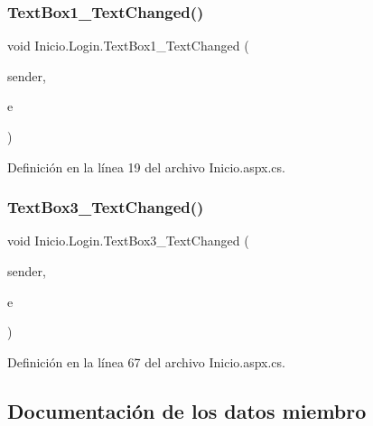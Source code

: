 \subsubsection{\texorpdfstring{TextBox1\_TextChanged()}{TextBox1\_TextChanged()}}
{\footnotesize\ttfamily void Inicio.\+Login.\+Text\+Box1\+\_\+\+Text\+Changed (\begin{DoxyParamCaption}\item[{object}]{sender,  }\item[{Event\+Args}]{e }\end{DoxyParamCaption})\hspace{0.3cm}{\ttfamily [protected]}}



Definición en la línea 19 del archivo Inicio.\+aspx.\+cs.


\begin{DoxyCode}{0}

\end{DoxyCode}
\mbox{\label{classInicio_1_1Login_a332bc2333d4b1baf24c09b02f343734b}} 
\subsubsection{\texorpdfstring{TextBox3\_TextChanged()}{TextBox3\_TextChanged()}}
{\footnotesize\ttfamily void Inicio.\+Login.\+Text\+Box3\+\_\+\+Text\+Changed (\begin{DoxyParamCaption}\item[{object}]{sender,  }\item[{Event\+Args}]{e }\end{DoxyParamCaption})\hspace{0.3cm}{\ttfamily [protected]}}



Definición en la línea 67 del archivo Inicio.\+aspx.\+cs.


\begin{DoxyCode}{0}

\end{DoxyCode}


\subsection{Documentación de los datos miembro}
\mbox{\label{classInicio_1_1Login_a538759688d96a18839d8cf330a38b4e0}} 
